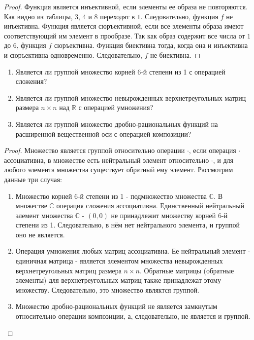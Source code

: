 \begin{proof}
	Функция является инъективной, если элементы ее образа не повторяются. Как видно из таблицы, $3$, $4$ и $8$ переходят в $1$. Следовательно, функция $f$ не инъективна.
	\newline
	Функция является сюръективной, если все элементы образа имеют соответствующий им элемент в прообразе. Так как образ содержит все числа от $1$ до $6$, функция $f$ сюръективна.
	\newline
	Функция биективна тогда, когда она и инъективна и сюръективна одновременно. Следовательно, $f$ не биективна.
\end{proof}

\begin{problem}
	\begin{minipage}[t]{\linegoal}
		\begin{enumerate}[leftmargin=*]
			\item Является ли группой множество корней 6-й степени из 1 с операцией сложения?
			\item Является ли группой множество невырожденных верхнетреугольных матриц размера $n\times n$ над $\mathbb {R}$ с операцией умножения?
			\item Является ли группой множество дробно-рациональных функций на расширенной вещественной оси с операцией композиции?
		\end{enumerate}
	\end{minipage}
\end{problem}

\begin{proof}
	Множество является группой относительно операции $\cdot$, если операция $\cdot$ ассоциативна, в множестве есть нейтральный элемент относительно $\cdot$, и для любого элемента множества существует обратный ему элемент.
	\newline
	Рассмотрим данные три случая:
	\begin{enumerate}
		\item Множество корней 6-й степени из 1 - подмножество множества $\mathbb {C}$. В множестве $\mathbb {C}$ операция сложения ассоциативна. Единственный нейтральный элемент множества $\mathbb {C}$ - $(0, 0)$ не принадлежит множеству корней 6-й степени из 1. Следовательно, в нём нет нейтрального элемента, и группой оно не является.
		\item Операция умножения любых матриц ассоциативна. Ее нейтральный элемент - единичная матрица - является элементом множества невырожденных верхнетреугольных матриц размера $n\times n$. Обратные матрицы (обратные элементы) для верхнетреугольных матриц также принадлежат этому множеству. Следовательно, это множество являктся группой.
		\item Множество дробно-рациональных функций не является замкнутым относительно операции композиции, а, следовательно, не является и группой.
	\end{enumerate}
\end{proof}

